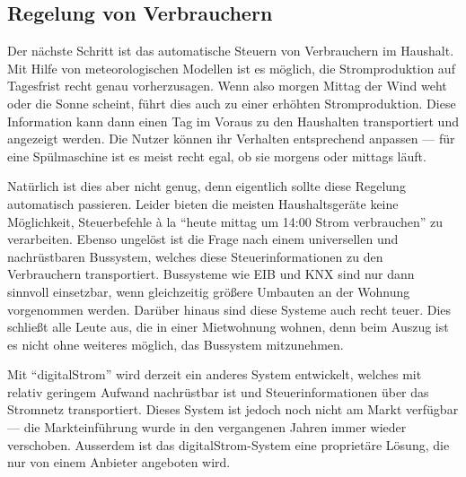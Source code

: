 \documentclass[12pt,BCOR=8.5mm]{scrartcl}
\begin{document}
\subsection{Regelung von Verbrauchern}\label{sub:steuern}

Der nächste Schritt ist das automatische Steuern von Verbrauchern im
Haushalt. Mit Hilfe von meteorologischen Modellen ist es möglich, die
Stromproduktion auf Tagesfrist recht genau vorherzusagen. Wenn also
morgen Mittag der Wind weht oder die Sonne scheint, führt dies auch zu
einer erhöhten Stromproduktion. Diese Information kann dann einen Tag im
Voraus zu den Haushalten transportiert und angezeigt werden. Die Nutzer
können ihr Verhalten entsprechend anpassen --- für eine Spülmaschine ist
es meist recht egal, ob sie morgens oder mittags läuft.

Natürlich ist dies aber nicht genug, denn eigentlich sollte diese
Regelung automatisch passieren. Leider bieten die meisten
Haushaltsgeräte keine Möglichkeit, Steuerbefehle à la "`heute mittag um
14:00 Strom verbrauchen"' zu verarbeiten. Ebenso ungelöst ist die Frage
nach einem universellen und nachrüstbaren Bussystem, welches diese
Steuerinformationen zu den Verbrauchern transportiert. Bussysteme wie
EIB und KNX sind nur dann sinnvoll einsetzbar, wenn gleichzeitig größere
Umbauten an der Wohnung vorgenommen werden. Darüber hinaus sind diese
Systeme auch recht teuer. Dies schließt alle Leute aus, die in einer
Mietwohnung wohnen, denn beim Auszug ist es nicht ohne weiteres
möglich, das Bussystem mitzunehmen.

Mit "`digitalStrom"' wird derzeit ein anderes System entwickelt, welches
mit relativ geringem Aufwand nachrüstbar ist und Steuerinformationen
über das Stromnetz transportiert. Dieses System ist jedoch noch nicht am
Markt verfügbar --- die Markteinführung wurde in den vergangenen Jahren
immer wieder verschoben. Ausserdem ist das digitalStrom-System eine
proprietäre Lösung, die nur von einem Anbieter angeboten wird. 
\end{document}
